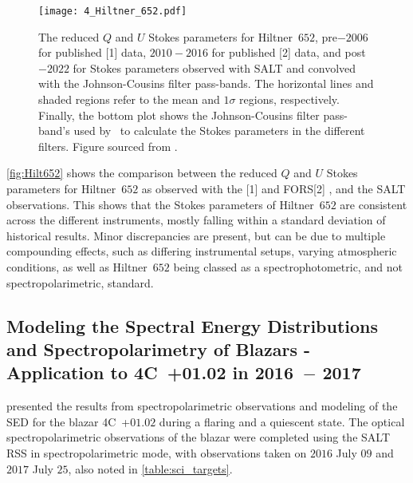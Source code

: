 \begin{figure}[t]
    \centering
    \texttt{[image: 4\_Hiltner\_652.pdf]}
    \caption{The reduced $Q$ and $U$ Stokes parameters for Hiltner~$652$, pre$-2006$ for published [1] data, $2010 - 2016$ for published [2] data, and post$-2022$ for Stokes parameters observed with \gls{SALT} and convolved with the Johnson-Cousins filter pass-bands. The horizontal lines and shaded regions refer to the  mean and $1\sigma$ regions, respectively. Finally, the bottom plot shows the Johnson-Cousins filter pass-band’s used by \polsalt\ to calculate the Stokes parameters in the different filters. Figure sourced from \citep{Cooper_HEASA2022}.}
    \label{fig:Hilt652}
\end{figure}

\autoref{fig:Hilt652} shows the comparison between the reduced $Q$ and $U$ Stokes parameters for Hiltner~$652$ as observed with the %
[1] and \gls{FORS}[2] \citep[as reported by][]{FORS1, FORS2}, and the \gls{SALT} observations. 
This shows that the Stokes parameters of Hiltner~$652$ are consistent across the different instruments, mostly falling within a standard deviation of historical results.
Minor discrepancies are present, but can be due to multiple compounding effects, such as differing instrumental setups, varying atmospheric conditions, as well as Hiltner~$652$ being classed as a spectrophotometric, and not spectropolarimetric, standard.

\subsection[Schutte et al.\ (2022)]{%
    Modeling the Spectral Energy Distributions and Spectro\-polari\-metry of Blazars - Application to 4C~+01.02 in 2016~$-$ 2017\\
    \citep{Schutte4C0102}
}

\citet{Schutte4C0102} presented the results from spectropolarimetric observations and modeling of the \gls{SED} for the blazar 4C~+$01.02$ during a flaring and a quiescent state.
The optical spectropolarimetric observations of the blazar were completed using the \gls{SALT} \gls{RSS} in spectropolarimetric mode, with observations taken on $2016$ July $09$ and $2017$ July $25$, also noted in \autoref{table:sci_targets}.

